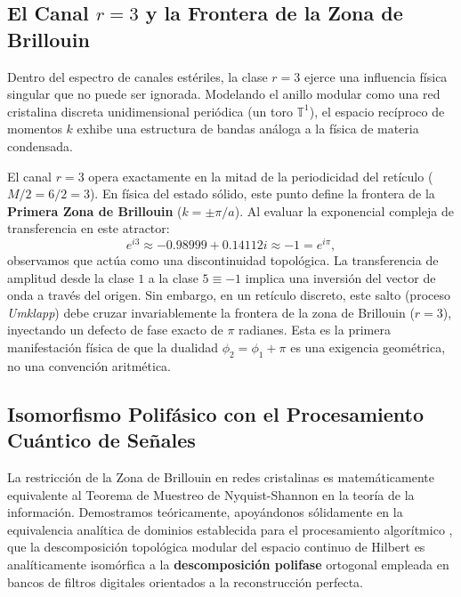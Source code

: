 \documentclass[12pt,a4paper]{article}
\theoremstyle{plain}
\theoremstyle{definition}
\theoremstyle{remark}
\begin{document}
\subsection{El Canal $r=3$ y la Frontera de la Zona de Brillouin}

Dentro del espectro de canales estériles, la clase $r=3$ ejerce una influencia física singular que no puede ser ignorada. Modelando el anillo modular como una red cristalina discreta unidimensional periódica (un toro $\mathbb{T}^1$), el espacio recíproco de momentos $k$ exhibe una estructura de bandas análoga a la física de materia condensada.

El canal $r=3$ opera exactamente en la mitad de la periodicidad del retículo ($M/2 = 6/2 = 3$). En física del estado sólido, este punto define la frontera de la \textbf{Primera Zona de Brillouin} ($k = \pm \pi/a$). Al evaluar la exponencial compleja de transferencia en este atractor:
\begin{equation}
e^{i3} \approx -0.98999 + 0.14112i \approx -1 = e^{i\pi},
\end{equation}
observamos que actúa como una discontinuidad topológica. La transferencia de amplitud desde la clase $1$ a la clase $5 \equiv -1$ implica una inversión del vector de onda a través del origen. Sin embargo, en un retículo discreto, este salto (proceso \textit{Umklapp}) debe cruzar invariablemente la frontera de la zona de Brillouin ($r=3$), inyectando un defecto de fase exacto de $\pi$ radianes. Esta es la primera manifestación física de que la dualidad $\phi_2 = \phi_1 + \pi$ es una exigencia geométrica, no una convención aritmética.

\subsection{Isomorfismo Polifásico con el Procesamiento Cuántico de Señales}

La restricción de la Zona de Brillouin en redes cristalinas es matemáticamente equivalente al Teorema de Muestreo de Nyquist-Shannon en la teoría de la información. Demostramos teóricamente, apoyándonos sólidamente en la equivalencia analítica de dominios establecida para el procesamiento algorítmico \cite{Peinador_Isomorfismo_DSP_2025}, que la descomposición topológica modular del espacio continuo de Hilbert es analíticamente isomórfica a la \textbf{descomposición polifase} ortogonal empleada en bancos de filtros digitales orientados a la reconstrucción perfecta.
\end{document}
